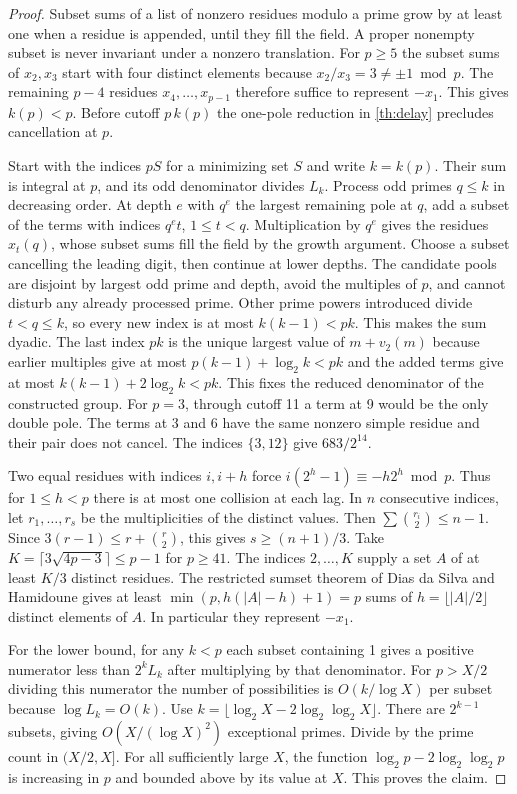\documentclass[11pt]{article}
\begin{document}
\begin{proof}
Subset sums of a list of nonzero residues modulo a prime grow by at least one when a residue is appended, until they fill the field. A proper nonempty subset is never invariant under a nonzero translation. For $p\ge5$ the subset sums of $x_2,x_3$ start with four distinct elements because $x_2/x_3=3\ne\pm1\bmod p$. The remaining $p-4$ residues $x_4,\ldots,x_{p-1}$ therefore suffice to represent $-x_1$. This gives $k(p)<p$. Before cutoff $p\,k(p)$ the one-pole reduction in \cref{th:delay} precludes cancellation at $p$.

Start with the indices $pS$ for a minimizing set $S$ and write $k=k(p)$. Their sum is integral at $p$, and its odd denominator divides $L_k$. Process odd primes $q\le k$ in decreasing order. At depth $e$ with $q^e$ the largest remaining pole at $q$, add a subset of the terms with indices $q^e t$, $1\le t<q$. Multiplication by $q^e$ gives the residues $x_t(q)$, whose subset sums fill the field by the growth argument. Choose a subset cancelling the leading digit, then continue at lower depths. The candidate pools are disjoint by largest odd prime and depth, avoid the multiples of $p$, and cannot disturb any already processed prime. Other prime powers introduced divide $t<q\le k$, so every new index is at most $k(k-1)<pk$. This makes the sum dyadic. The last index $pk$ is the unique largest value of $m+v_2(m)$ because earlier multiples give at most $p(k-1)+\log_2 k<pk$ and the added terms give at most $k(k-1)+2\log_2 k<pk$. This fixes the reduced denominator of the constructed group. For $p=3$, through cutoff 11 a term at 9 would be the only double pole. The terms at 3 and 6 have the same nonzero simple residue and their pair does not cancel. The indices $\{3,12\}$ give $683/2^{14}$.

Two equal residues with indices $i,i+h$ force $i(2^h-1)\equiv-h2^h\bmod p$. Thus for $1\le h<p$ there is at most one collision at each lag. In $n$ consecutive indices, let $r_1,\ldots,r_s$ be the multiplicities of the distinct values. Then $\sum\binom{r_i}{2}\le n-1$. Since $3(r-1)\le r+\binom r2$, this gives $s\ge(n+1)/3$. Take $K=\lceil3\sqrt{4p-3}\rceil\le p-1$ for $p\ge41$. The indices $2,\ldots,K$ supply a set $A$ of at least $K/3$ distinct residues. The restricted sumset theorem of Dias da Silva and Hamidoune \cite[Theorem~4.1, p.~144]{dias} gives at least $\min(p,h(|A|-h)+1)=p$ sums of $h=\lfloor |A|/2\rfloor$ distinct elements of $A$. In particular they represent $-x_1$.

For the lower bound, for any $k<p$ each subset containing 1 gives a positive numerator less than $2^kL_k$ after multiplying by that denominator. For $p>X/2$ dividing this numerator the number of possibilities is $O(k/\log X)$ per subset because $\log L_k=O(k)$. Use $k=\lfloor\log_2X-2\log_2\log_2X\rfloor$. There are $2^{k-1}$ subsets, giving $O(X/(\log X)^2)$ exceptional primes. Divide by the prime count in $(X/2,X]$. For all sufficiently large $X$, the function $\log_2p-2\log_2\log_2p$ is increasing in $p$ and bounded above by its value at $X$. This proves the claim.
\end{proof}
\end{document}
